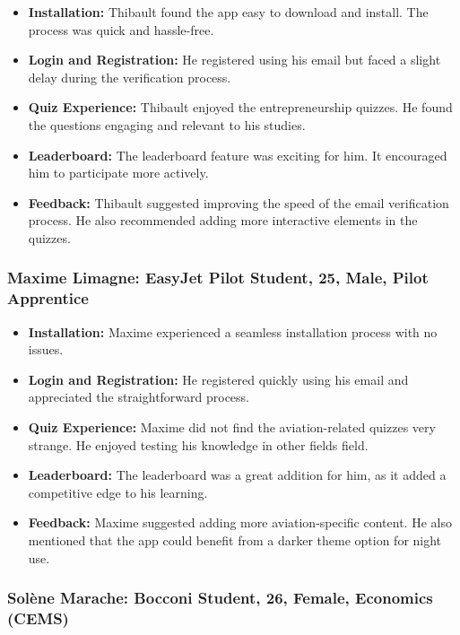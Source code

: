 \begin{itemize}
    \item \textbf{Installation:} Thibault found the app easy to download and install. The process was quick and hassle-free.
    \item \textbf{Login and Registration:} He registered using his email but faced a slight delay during the verification process.
    \item \textbf{Quiz Experience:} Thibault enjoyed the entrepreneurship quizzes. He found the questions engaging and relevant to his studies.
    \item \textbf{Leaderboard:} The leaderboard feature was exciting for him. It encouraged him to participate more actively.
    \item \textbf{Feedback:} Thibault suggested improving the speed of the email verification process. He also recommended adding more interactive elements in the quizzes.
\end{itemize}

\subsubsection{Maxime Limagne: EasyJet Pilot Student, 25, Male, Pilot Apprentice}

\begin{itemize}
    \item \textbf{Installation:} Maxime experienced a seamless installation process with no issues.
    \item \textbf{Login and Registration:} He registered quickly using his email and appreciated the straightforward process.
    \item \textbf{Quiz Experience:} Maxime did not find the aviation-related quizzes very strange. He enjoyed testing his knowledge in other fields field.
    \item \textbf{Leaderboard:} The leaderboard was a great addition for him, as it added a competitive edge to his learning.
    \item \textbf{Feedback:} Maxime suggested adding more aviation-specific content. He also mentioned that the app could benefit from a darker theme option for night use.
\end{itemize}

\subsubsection{Solène Marache: Bocconi Student, 26, Female, Economics (CEMS)}

